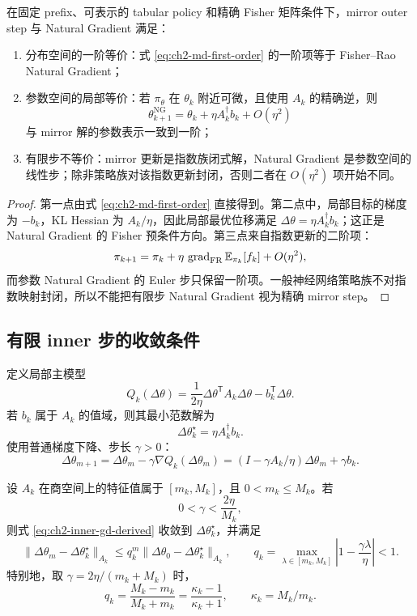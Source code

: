 \begin{theorem}
\label{thm:ch2-md-ng-equivalence}
在固定 prefix、可表示的 tabular policy 和精确 Fisher 矩阵条件下，mirror outer step 与 Natural Gradient 满足：
\begin{enumerate}
\item 分布空间的一阶等价：式 \eqref{eq:ch2-md-first-order} 的一阶项等于 Fisher--Rao Natural Gradient；
\item 参数空间的局部等价：若 $\pi_\theta$ 在 $\theta_k$ 附近可微，且使用 $A_k$ 的精确逆，则
\[
\theta_{k+1}^{\mathrm{NG}}
=\theta_k+\eta A_k^\dagger b_k+O(\eta^2)
\]
与 mirror 解的参数表示一致到一阶；
\item 有限步不等价：mirror 更新是指数族闭式解，Natural Gradient 是参数空间的线性步；除非策略族对该指数更新封闭，否则二者在 $O(\eta^2)$ 项开始不同。
\end{enumerate}
\end{theorem}

\begin{proof}
第一点由式 \eqref{eq:ch2-md-first-order} 直接得到。第二点中，局部目标的梯度为 $-b_k$，KL Hessian 为 $A_k/\eta$，因此局部最优位移满足 $\Delta\theta=\eta A_k^\dagger b_k$；这正是 Natural Gradient 的 Fisher 预条件方向。第三点来自指数更新的二阶项：
\[
\pi_{k+1}
=\pi_k+\eta\,\operatorname{grad}_{\mathrm{FR}}\mathbb{E}_{\pi_k}[f_k]
+O(\eta^2),
\]
而参数 Natural Gradient 的 Euler 步只保留一阶项。一般神经网络策略族不对指数映射封闭，所以不能把有限步 Natural Gradient 视为精确 mirror step。
\end{proof}

\subsection*{有限 inner 步的收敛条件}

定义局部主模型
\[
Q_k(\Delta\theta)
=
\frac{1}{2\eta}\Delta\theta^{\mathsf T}A_k\Delta\theta
-b_k^{\mathsf T}\Delta\theta.
\]
若 $b_k$ 属于 $A_k$ 的值域，则其最小范数解为
\[
\Delta\theta_k^\star=\eta A_k^\dagger b_k.
\]
使用普通梯度下降、步长 $\gamma>0$：
\begin{equation}
\label{eq:ch2-inner-gd-derived}
\Delta\theta_{m+1}
=
\Delta\theta_m-\gamma\nabla Q_k(\Delta\theta_m)
=
(I-\gamma A_k/\eta)\Delta\theta_m+\gamma b_k.
\end{equation}

\begin{theorem}
\label{thm:ch2-local-gd-derived}
设 $A_k$ 在商空间上的特征值属于
$[m_k,M_k]$，且 $0<m_k\leq M_k$。若
\[
0<\gamma<\frac{2\eta}{M_k},
\]
则式 \eqref{eq:ch2-inner-gd-derived} 收敛到 $\Delta\theta_k^\star$，并满足
\[
\|\Delta\theta_m-\Delta\theta_k^\star\|_{A_k}
\leq
q_k^m\|\Delta\theta_0-\Delta\theta_k^\star\|_{A_k},
\qquad
q_k=\max_{\lambda\in[m_k,M_k]}
\left|1-\frac{\gamma\lambda}{\eta}\right|<1.
\]
特别地，取 $\gamma=2\eta/(m_k+M_k)$ 时，
\[
q_k=\frac{M_k-m_k}{M_k+m_k}
=\frac{\kappa_k-1}{\kappa_k+1},
\qquad
\kappa_k=M_k/m_k.
\]
\end{theorem}

